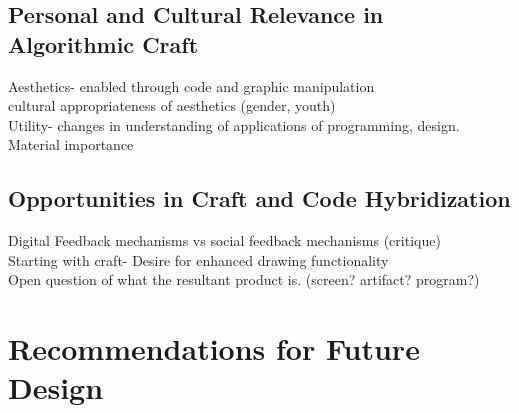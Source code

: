 \documentclass{sigchi}
\begin{document}
\subsection{Personal and Cultural Relevance in Algorithmic Craft}
Aesthetics- enabled through code and graphic manipulation\\
cultural appropriateness of aesthetics (gender, youth)\\
Utility- changes in understanding of applications of programming, design.
Material importance

\subsection{Opportunities in Craft and Code Hybridization}
Digital Feedback mechanisms vs social feedback mechanisms (critique)\\
Starting with craft- Desire for enhanced drawing functionality\\
Open question of what the resultant product is. (screen? artifact? program?)

\section{Recommendations for Future Design}
\end{document}
